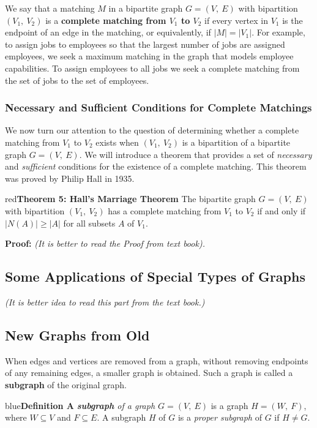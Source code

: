\documentclass[11pt]{article}
\newenvironment{definition}[1]{\begin{mybox}{blue}{\textbf{Definition #1}}}{\end{mybox}}
\newenvironment{theorem}[1]{\begin{mybox}{red}{\textbf{Theorem #1}}}{\end{mybox}}
\begin{document}
We say that a matching $M$ in a bipartite graph $G = (V,\ E)$ with bipartition $(V_1,\ V_2)$ is a \textbf{complete matching from $V_1$ to $V_2$} if every vertex in $V_1$ is the endpoint of an edge in the matching, or equivalently, if $|M| = |V_1|$. For example, to assign jobs to employees so that the largest number of jobs are assigned employees, we seek a maximum matching in the graph that models employee capabilities. To assign employees to all jobs we seek a complete matching from the set of jobs to the set of employees.

\subsubsection{Necessary and Sufficient Conditions for Complete Matchings}

We now turn our attention to the question of determining whether a complete matching from $V_1$ to $V_2$ exists when $(V_1,\ V_2)$ is a bipartition of a bipartite graph $G = (V,\ E)$. We will introduce a theorem that provides a set of \textit{necessary} and \textit{sufficient} conditions for the existence of a complete matching. This theorem was proved by Philip Hall in 1935.

\begin{theorem}{5: Hall's Marriage Theorem}
The bipartite graph $G = (V,\ E)$ with bipartition $(V_1,\ V_2)$ has a complete matching from $V_1$ to $V_2$ if and only if $|N(A)| \geq |A|$ for all subsets $A$ of $V_1$.
\end{theorem}

\textbf{Proof:} \textit{(It is better to read the Proof from text book).}

\subsection{Some Applications of Special Types of Graphs}

\textit{(It is better idea to read this part from the text book.)}

\subsection{New Graphs from Old}

When edges and vertices are removed from a graph, without removing endpoints of any remaining edges, a smaller graph is obtained. Such a graph is called a \textbf{subgraph} of the original graph.

\begin{definition}{7}
A \textit{\textbf{subgraph} of a graph $G = (V,\ E)$} is a graph $H = (W,\ F)$, where $W \subseteq V$ and $F \subseteq E$. A subgraph $H$ of $G$ is a \textit{proper subgraph} of $G$ if $H \neq G$.
\end{definition}
\end{document}
